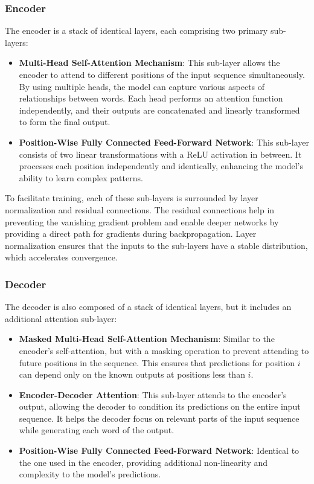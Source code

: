 \subsubsection{Encoder}

The encoder is a stack of identical layers, each comprising two primary sub-layers:

\begin{itemize}
	\item \textbf{Multi-Head Self-Attention Mechanism}: This sub-layer allows the encoder to attend to different positions of the input sequence simultaneously. By using multiple heads, the model can capture various aspects of relationships between words. Each head performs an attention function independently, and their outputs are concatenated and linearly transformed to form the final output.

	\item \textbf{Position-Wise Fully Connected Feed-Forward Network}: This sub-layer consists of two linear transformations with a ReLU activation in between. It processes each position independently and identically, enhancing the model's ability to learn complex patterns.
\end{itemize}

To facilitate training, each of these sub-layers is surrounded by layer normalization and residual connections. The residual connections help in preventing the vanishing gradient problem and enable deeper networks by providing a direct path for gradients during backpropagation. Layer normalization ensures that the inputs to the sub-layers have a stable distribution, which accelerates convergence.

\subsubsection{Decoder}

The decoder is also composed of a stack of identical layers, but it includes an additional attention sub-layer:

\begin{itemize}
	\item \textbf{Masked Multi-Head Self-Attention Mechanism}: Similar to the encoder's self-attention, but with a masking operation to prevent attending to future positions in the sequence. This ensures that predictions for position \( i \) can depend only on the known outputs at positions less than \( i \).

	\item \textbf{Encoder-Decoder Attention}: This sub-layer attends to the encoder's output, allowing the decoder to condition its predictions on the entire input sequence. It helps the decoder focus on relevant parts of the input sequence while generating each word of the output.

	\item \textbf{Position-Wise Fully Connected Feed-Forward Network}: Identical to the one used in the encoder, providing additional non-linearity and complexity to the model's predictions.
\end{itemize}

